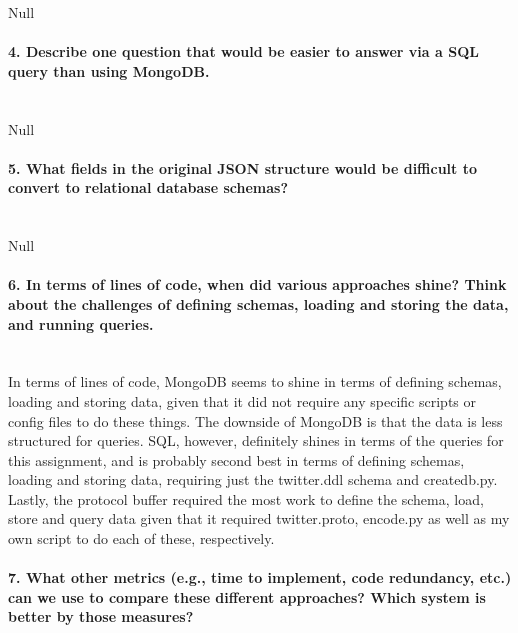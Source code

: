 \documentclass[12pt]{article}
\begin{document}
Null

\paragraph{4. Describe one question that would be easier to answer via a SQL query than using MongoDB.}\mbox{}\\

Null

\paragraph{5. What fields in the original JSON structure would be difficult to convert to relational database schemas?}\mbox{}\\

Null

\paragraph{6. In terms of lines of code, when did various approaches shine? Think about the challenges of defining schemas, loading and storing the data, and running queries.}\mbox{}\\

In terms of lines of code, MongoDB seems to shine in terms of defining schemas, loading and storing data, given that it did not require any specific scripts or config files to do these things. The downside of MongoDB is that the data is less structured for queries. SQL, however, definitely shines in terms of the queries for this assignment, and is probably second best in terms of defining schemas, loading and storing data, requiring just the twitter.ddl schema and createdb.py. Lastly, the protocol buffer required the most work to define the schema, load, store and query data given that it required twitter.proto, encode.py as well as my own script to do each of these, respectively.   

\paragraph{7. What other metrics (e.g., time to implement, code redundancy, etc.) can we use to compare these different approaches? Which system is better by those measures?}\mbox{}\\
\end{document}
